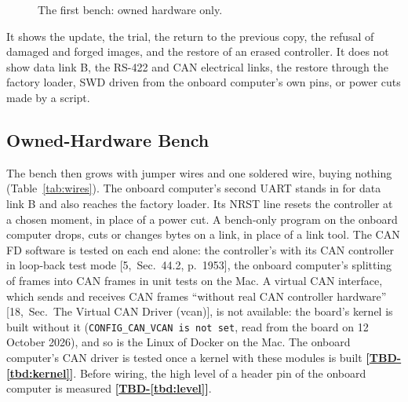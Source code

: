 \documentclass[11pt,a4paper]{article}
\newcommand{\tbd}[1]{\mbox{\textbf{[\hyperref[tbd:#1]{TBD-\ref*{tbd:#1}}]}}}
\begin{document}
\begin{figure}[H]
\centering
{}
\caption{The first bench: owned hardware only.}
\label{fig:bench1}
\end{figure}

\noindent It shows the update, the trial, the return to the previous copy, the
refusal of damaged and forged images, and the restore of an erased controller.
It does not show data link B, the RS-422 and CAN electrical links, the restore
through the factory loader, SWD driven from the onboard computer's own pins, or
power cuts made by a script.

\subsection{Owned-Hardware Bench}
The bench then grows with jumper wires and one soldered wire, buying nothing
(Table~\ref{tab:wires}). The onboard computer's second UART stands
in for data link B and also reaches the factory loader. Its NRST line resets
the controller at a chosen moment, in place of a power cut. A bench-only
program on the onboard computer drops, cuts or changes bytes on a link, in
place of a link tool. The CAN FD software is tested on each end alone: the
controller's with its CAN controller in loop-back test mode [5,~Sec.~44.2,
p.~1953], the onboard computer's splitting of frames into CAN frames in unit tests on
the Mac. A virtual CAN interface, which sends and receives CAN frames
``without real CAN controller hardware'' [18,~Sec.~The Virtual CAN Driver
(vcan)], is not available: the board's kernel is built without it
(\texttt{CONFIG\_CAN\_VCAN is not set}, read from the board on 12 October
2026), and so is the Linux of Docker on the Mac. The onboard computer's CAN
driver is tested once a kernel with these modules is built \tbd{kernel}. Before wiring, the high level of a
header pin of the onboard computer is measured \tbd{level}.
\end{document}
